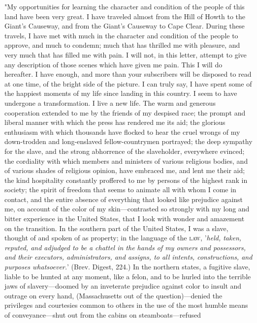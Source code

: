 "My opportunities for learning the character and condition of the people
of this land have been very great. I have traveled almost from the Hill
of Howth to the Giant's Causeway, and from the Giant's Causeway to Cape
Clear. During these travels, I have met with much in the character and
condition of the people to approve, and much to condemn; much that has
thrilled me with pleasure, and very much that has filled me with pain. I
will not, in this letter, attempt to give any description of those
scenes which have given me pain. This I will do hereafter. I have
enough, and more than your {\protect\hypertarget{370}{}{}}subscribers
will be disposed to read at one time, of the bright side of the picture.
I can truly say, I have spent some of the happiest moments of my life
since landing in this country. I seem to have undergone a
transformation. I live a new life. The warm and generous cooperation
extended to me by the friends of my despised race; the prompt and
liberal manner with which the press has rendered me its aid; the
glorious enthusiasm with which thousands have flocked to hear the cruel
wrongs of my down-trodden and long-enslaved fellow-countrymen portrayed;
the deep sympathy for the slave, and the strong abhorrence of the
slaveholder, everywhere evinced; the cordiality with which members and
ministers of various religious bodies, and of various shades of
religious opinion, have embraced me, and lent me their aid; the kind
hospitality constantly proffered to me by persons of the highest rank in
society; the spirit of freedom that seems to animate all with whom I
come in contact, and the entire absence of everything that looked like
prejudice against me, on account of the color of my skin---contrasted so
strongly with my long and bitter experience in the United States, that I
look with wonder and amazement on the transition. In the southern part
of the United States, I was a slave, thought of and spoken of as
property; in the language of the \textsc{law}, {'}\emph{held, taken,
reputed, and adjudged to be a chattel in the hands of my owners and
possessors, and their executors, administrators, and assigns, to all
intents, constructions, and purposes whatsoever.}{'} (Brev. Digest,
224.) In the northern states, a fugitive slave, liable to be hunted at
any moment, like a felon, and to be hurled into the terrible jaws of
slavery---doomed by an inveterate prejudice against color to insult and
outrage on every hand, (Massachusetts out of the question)---denied the
privileges and courtesies common to others in the use of the most humble
means of conveyance---shut out from the cabins on steamboats---refused
